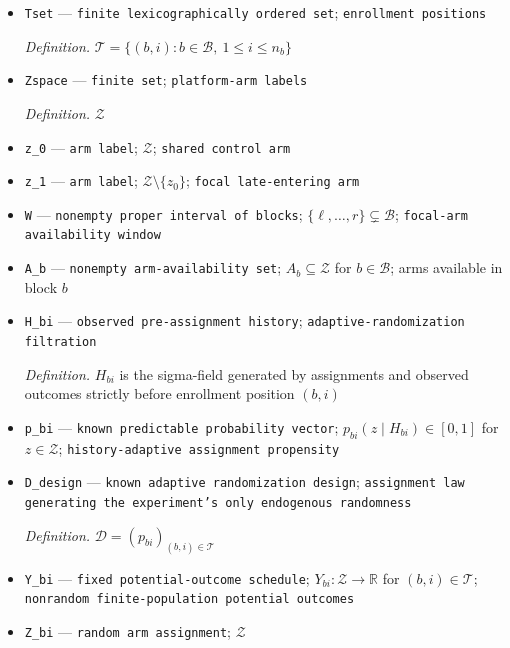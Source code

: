 \documentclass{article}
\begin{document}
\begin{itemize}
  \item \texttt{Tset} --- \texttt{finite lexicographically ordered set}; \texttt{enrollment positions}
  \par\smallskip\noindent\emph{Definition.} \(\mathcal T=\{(b,i):b\in\mathcal B,\ 1\le i\le n_b\}\)
  \item \texttt{Zspace} --- \texttt{finite set}; \texttt{platform-\allowbreak{}arm labels}
  \par\smallskip\noindent\emph{Definition.} \(\mathcal Z\)
  \item \texttt{z\_\allowbreak{}0} --- \texttt{arm label}; \(\mathcal Z\); \texttt{shared control arm}
  \item \texttt{z\_\allowbreak{}1} --- \texttt{arm label}; \(\mathcal Z\setminus\{z_0\}\); \texttt{focal late-\allowbreak{}entering arm}
  \item \texttt{W} --- \texttt{nonempty proper interval of blocks}; \(\{\ell,\ldots,r\}\subsetneq\mathcal B\); \texttt{focal-\allowbreak{}arm availability window}
  \item \texttt{A\_\allowbreak{}b} --- \texttt{nonempty arm-\allowbreak{}availability set}; \(A_b\subseteq\mathcal Z\) for \(b\in\mathcal B\); arms available in block \(b\)
  \item \texttt{H\_\allowbreak{}bi} --- \texttt{observed pre-\allowbreak{}assignment history}; \texttt{adaptive-\allowbreak{}randomization filtration}
  \par\smallskip\noindent\emph{Definition.} \(H_{bi}\) is the sigma-field generated by assignments and observed outcomes strictly before enrollment position \((b,i)\)
  \item \texttt{p\_\allowbreak{}bi} --- \texttt{known predictable probability vector}; \(p_{bi}(z\mid H_{bi})\in[0,1]\) for \(z\in\mathcal Z\); \texttt{history-\allowbreak{}adaptive assignment propensity}
  \item \texttt{D\_\allowbreak{}design} --- \texttt{known adaptive randomization design}; \texttt{assignment law generating the experiment's only endogenous randomness}
  \par\smallskip\noindent\emph{Definition.} \(\mathcal D=(p_{bi})_{(b,i)\in\mathcal T}\)
  \item \texttt{Y\_\allowbreak{}bi} --- \texttt{fixed potential-\allowbreak{}outcome schedule}; \(Y_{bi}:\mathcal Z\to\mathbb R\) for \((b,i)\in\mathcal T\); \texttt{nonrandom finite-\allowbreak{}population potential outcomes}
  \item \texttt{Z\_\allowbreak{}bi} --- \texttt{random arm assignment}; \(\mathcal Z\)

\end{itemize}
\end{document}
